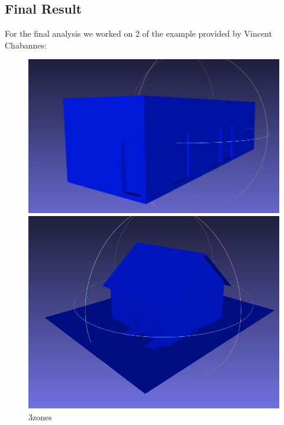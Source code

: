 \documentclass{article}
\begin{document}
\subsection{Final Result}

For the final analysis we worked on 2 of the example provided by Vincent Chabannes:
\vspace{0.5cm}
\begin{figure}[H]
  \centering
  \begin{minipage}[t]{0.29\textwidth}
    \includegraphics[width=\textwidth]{../../images/screen_kinetic/3zones.png}
    \caption*{3zones}
  \end{minipage}
  \hspace{0.05\textwidth}
  \begin{minipage}[t]{0.27\textwidth}
    \includegraphics[width=\textwidth]{../../images/screen_kinetic/ACJasmin.png}

\end{minipage}
\end{figure}
\end{document}
